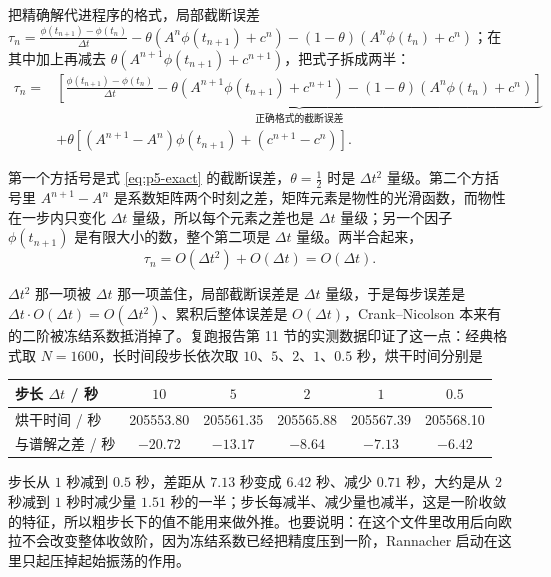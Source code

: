把精确解代进程序的格式，局部截断误差 $\tau_n=\frac{\phi(t_{n+1})-\phi(t_n)}{\Delta t}-\theta\left(A^n\phi(t_{n+1})+c^n\right)-(1-\theta)\left(A^n\phi(t_n)+c^n\right)$；在其中加上再减去 $\theta\left(A^{n+1}\phi(t_{n+1})+c^{n+1}\right)$，把式子拆成两半：
\begin{equation}
\begin{aligned}
\tau_n={}&\underbrace{\left[\frac{\phi(t_{n+1})-\phi(t_n)}{\Delta t}
-\theta\left(A^{n+1}\phi(t_{n+1})+c^{n+1}\right)
-(1-\theta)\left(A^n\phi(t_n)+c^n\right)\right]}_{\text{正确格式的截断误差}}\\
&+\theta\left[\left(A^{n+1}-A^n\right)\phi(t_{n+1})+\left(c^{n+1}-c^n\right)\right].
\end{aligned}
\label{eq:p5-tau}
\end{equation}

第一个方括号是式 \eqref{eq:p5-exact} 的截断误差，$\theta=\frac12$ 时是 $\Delta t^2$ 量级。第二个方括号里 $A^{n+1}-A^n$ 是系数矩阵两个时刻之差，矩阵元素是物性的光滑函数，而物性在一步内只变化 $\Delta t$ 量级，所以每个元素之差也是 $\Delta t$ 量级；另一个因子 $\phi(t_{n+1})$ 是有限大小的数，整个第二项是 $\Delta t$ 量级。两半合起来，
\begin{equation}
\tau_n=O(\Delta t^2)+O(\Delta t)=O(\Delta t).
\label{eq:p5-order}
\end{equation}

$\Delta t^2$ 那一项被 $\Delta t$ 那一项盖住，局部截断误差是 $\Delta t$ 量级，于是每步误差是 $\Delta t\cdot O(\Delta t)=O(\Delta t^2)$、累积后整体误差是 $O(\Delta t)$，Crank--Nicolson 本来有的二阶被冻结系数抵消掉了。复跑报告第 11 节的实测数据印证了这一点：经典格式取 $N=1600$，长时间段步长依次取 $10$、$5$、$2$、$1$、$0.5$ 秒，烘干时间分别是
\begin{center}
\begin{tabular}{@{}lccccc@{}}
\toprule
步长 $\Delta t$ / 秒 & $10$ & $5$ & $2$ & $1$ & $0.5$ \\
\midrule
烘干时间 / 秒 & 205553.80 & 205561.35 & 205565.88 & 205567.39 & 205568.10 \\
与谱解之差 / 秒 & $-20.72$ & $-13.17$ & $-8.64$ & $-7.13$ & $-6.42$ \\
\bottomrule
\end{tabular}
\end{center}

步长从 $1$ 秒减到 $0.5$ 秒，差距从 $7.13$ 秒变成 $6.42$ 秒、减少 $0.71$ 秒，大约是从 $2$ 秒减到 $1$ 秒时减少量 $1.51$ 秒的一半；步长每减半、减少量也减半，这是一阶收敛的特征，所以粗步长下的值不能用来做外推。也要说明：在这个文件里改用后向欧拉不会改变整体收敛阶，因为冻结系数已经把精度压到一阶，Rannacher 启动在这里只起压掉起始振荡的作用。

